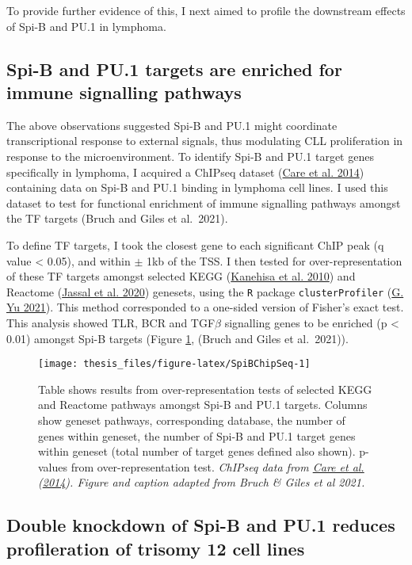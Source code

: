 \documentclass[11pt, a4paper, twosided]{book}
\begin{document}
To provide further evidence of this, I next aimed to profile the downstream effects of Spi-B and PU.1 in lymphoma.

\hypertarget{spib-chip}{%
\subsection{Spi-B and PU.1 targets are enriched for immune signalling pathways}\label{spib-chip}}

The above observations suggested Spi-B and PU.1 might coordinate transcriptional response to external signals, thus modulating CLL proliferation in response to the microenvironment. To identify Spi-B and PU.1 target genes specifically in lymphoma, I acquired a ChIPseq dataset (\protect\hyperlink{ref-Care2014}{Care et al. 2014}) containing data on Spi-B and PU.1 binding in lymphoma cell lines. I used this dataset to test for functional enrichment of immune signalling pathways amongst the TF targets (Bruch and Giles et al.~2021).

To define TF targets, I took the closest gene to each significant ChIP peak (q value \textless{} 0.05), and within \(\pm\) 1kb of the TSS. I then tested for over-representation of these TF targets amongst selected KEGG (\protect\hyperlink{ref-KEGG}{Kanehisa et al. 2010}) and Reactome (\protect\hyperlink{ref-Reactome}{Jassal et al. 2020}) genesets, using the \texttt{R} package \texttt{clusterProfiler} (\protect\hyperlink{ref-R-clusterProfiler}{G. Yu 2021}). This method corresponded to a one-sided version of Fisher's exact test. This analysis showed TLR, BCR and TGF\(\beta\) signalling genes to be enriched (p \textless{} 0.01) amongst Spi-B targets (Figure \ref{fig:SpiBChipSeq}, (Bruch and Giles et al.~2021)).


\begin{figure}

{\centering \texttt{[image: thesis\_files/figure-latex/SpiBChipSeq-1]} 

}

\caption{Table shows results from over-representation tests of selected KEGG and Reactome pathways amongst Spi-B and PU.1 targets. Columns show geneset pathways, corresponding database, the number of genes within geneset, the number of Spi-B and PU.1 target genes within geneset (total number of target genes defined also shown). p-values from over-representation test. \emph{ChIPseq data from \protect\hyperlink{ref-Care2014}{Care et al.} (\protect\hyperlink{ref-Care2014}{2014}). Figure and caption adapted from Bruch \& Giles et al 2021.}}\label{fig:SpiBChipSeq}
\end{figure}
\hypertarget{shRNA-KDs}{%
\subsection{Double knockdown of Spi-B and PU.1 reduces profileration of trisomy 12 cell lines}\label{shRNA-KDs}}
\end{document}
